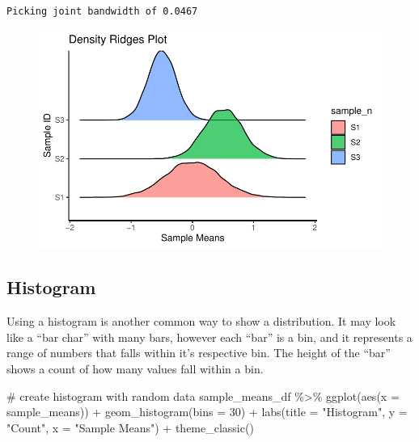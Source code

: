 \documentclass[
  letterpaper,
  DIV=11,
  numbers=noendperiod]{scrreprt}
\newenvironment{Shaded}{\begin{snugshade}}{\end{snugshade}}
\newcommand{\AttributeTok}[1]{\textcolor[rgb]{0.40,0.45,0.13}{#1}}
\newcommand{\CommentTok}[1]{\textcolor[rgb]{0.37,0.37,0.37}{#1}}
\newcommand{\DecValTok}[1]{\textcolor[rgb]{0.68,0.00,0.00}{#1}}
\newcommand{\FunctionTok}[1]{\textcolor[rgb]{0.28,0.35,0.67}{#1}}
\newcommand{\NormalTok}[1]{\textcolor[rgb]{0.00,0.23,0.31}{#1}}
\newcommand{\SpecialCharTok}[1]{\textcolor[rgb]{0.37,0.37,0.37}{#1}}
\newcommand{\StringTok}[1]{\textcolor[rgb]{0.13,0.47,0.30}{#1}}
\begin{document}
\begin{verbatim}
Picking joint bandwidth of 0.0467
\end{verbatim}

\begin{figure}[H]

{\centering \includegraphics{./visualizing-data_files/figure-pdf/unnamed-chunk-3-1.pdf}

}

\end{figure}

\hypertarget{histogram}{%
\subsection{Histogram}\label{histogram}}

Using a histogram is another common way to show a distribution. It may
look like a ``bar char'' with many bars, however each ``bar'' is a bin,
and it represents a range of numbers that falls within it's respective
bin. The height of the ``bar'' shows a count of how many values fall
within a bin.

\begin{Shaded}
\begin{Highlighting}[]
\CommentTok{\# create histogram with random data }
\NormalTok{sample\_means\_df }\SpecialCharTok{\%\textgreater{}\%}
  \FunctionTok{ggplot}\NormalTok{(}\FunctionTok{aes}\NormalTok{(}\AttributeTok{x =}\NormalTok{ sample\_means)) }\SpecialCharTok{+}
  \FunctionTok{geom\_histogram}\NormalTok{(}\AttributeTok{bins =} \DecValTok{30}\NormalTok{) }\SpecialCharTok{+}
  \FunctionTok{labs}\NormalTok{(}\AttributeTok{title =} \StringTok{"Histogram"}\NormalTok{, }\AttributeTok{y =} \StringTok{"Count"}\NormalTok{, }\AttributeTok{x =} \StringTok{"Sample Means"}\NormalTok{) }\SpecialCharTok{+}
  \FunctionTok{theme\_classic}\NormalTok{()}
\end{Highlighting}
\end{Shaded}
\end{document}
